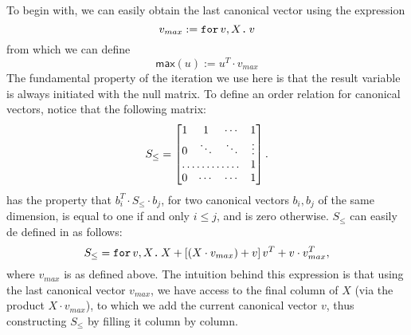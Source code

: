 To begin with, we can easily obtain the last canonical vector using the expression $$v_{max} := \texttt{for}\, v,X \texttt{.}\, v$$ from which we can define $$\mathsf{max}(u):=u^T\cdot v_{max}$$
The fundamental property of the iteration we use here is that the result variable is always initiated with the null matrix.
To define an order relation for canonical vectors, notice that the following matrix:
\[
S_{\leq} = \begin{bmatrix}
    1 & 1 & \cdots &  1 \\
    0 & \ddots & \ddots & \vdots \\
    \hdotsfor{3} & 1 \\
    0 & \cdots & \cdots & 1 
\end{bmatrix}.
\]
has the property that $b_i^T\cdot S_{\leq} \cdot b_j$, for two canonical vectors $b_i,b_j$ of the same dimension, is equal to one if and only $i\leq j$, and is zero otherwise. $S_{\leq}$ can easily de defined in \langfor as follows:
$$S_{\leq}=\texttt{for}\, v,X \texttt{.}\, X + \left[ (X\cdot v_{max}) + v \right]v^T + v\cdot v^T_{max},$$
where $v_{max}$ is as defined above. The intuition behind this expression is that using the last canonical vector $v_{max}$, we have access to the final column of $X$ (via the product $X\cdot v_{max}$), to which we add the current canonical vector $v$, thus constructing $S_{\leq}$ by filling it column by column.

